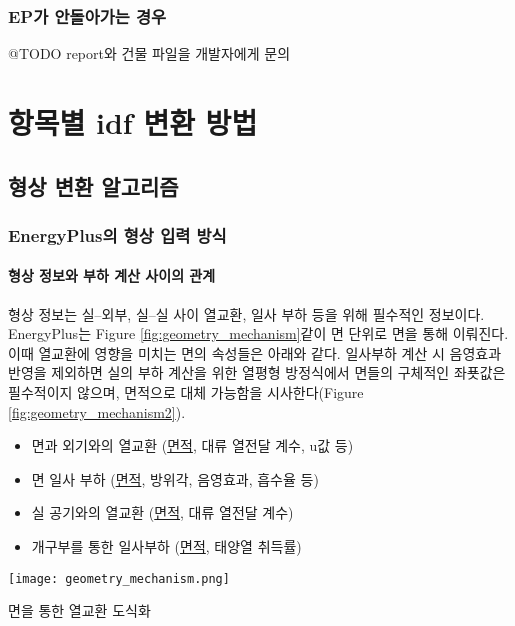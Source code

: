 \subsection{EP가 안돌아가는 경우}
@TODO report와 건물 파일을 개발자에게 문의


\chapter{항목별 idf 변환 방법}
\label{chap:simulator_geometry}

\section{형상 변환 알고리즘}

\subsection{EnergyPlus의 형상 입력 방식}

\subsubsection{형상 정보와 부하 계산 사이의 관계}

형상 정보는 실--외부, 실--실 사이 열교환, 일사 부하 등을 위해 필수적인 정보이다. EnergyPlus는 Figure \ref{fig:geometry_mechanism}\과 같이 면 단위로  면을 통해 이뤄진다. 이때 열교환에 영향을 미치는 면의 속성들은 아래와 같다. 일사부하 계산 시 음영효과 반영을 제외하면 실의 부하 계산을 위한 열평형 방정식에서 면들의 구체적인 좌푯값은 필수적이지 않으며, 면적으로 대체 가능함을 시사한다(Figure \ref{fig:geometry_mechanism2}).

\begin{itemize}
  \item 면과 외기와의 열교환 (\underline{면적}, 대류 열전달 계수, u값 등)
  \item 면 일사 부하 (\underline{면적}, 방위각, 음영효과, 흡수율 등)
  \item 실 공기와의 열교환 (\underline{면적}, 대류 열전달 계수)
  \item 개구부를 통한 일사부하 (\underline{면적}, 태양열 취득률)
\end{itemize}

\begin{defaultfigure}
  \texttt{[image: geometry\_mechanism.png]}
  \caption{면을 통한 열교환 도식화}
  \label{fig:geometry_mechanism}
\end{defaultfigure}

